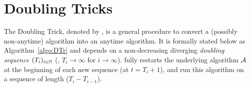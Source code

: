 \documentclass[12pt]{colt2018} %
\begin{document}
\section{Doubling Tricks }\label{sec:genericAlgo}


The Doubling Trick, denoted by \DT, is a general procedure to convert a (possibly non-anytime) algorithm into an anytime algorithm.
It is formally stated below as Algorithm~\ref{algo:DTr} and depends on a non-decreasing diverging \emph{doubling sequence} $(T_i)_{i\in \mathbb{N}}$
(\ie, $T_i\to\infty$ for $i\to\infty$).
\DT{} fully restarts the underlying algorithm $\mathcal{A}$ at the beginning of each new sequence (at $t = T_i + 1$), and run this algorithm on a sequence of length ($T_i - T_{i-1}$).


%

%
%




\end{document}
